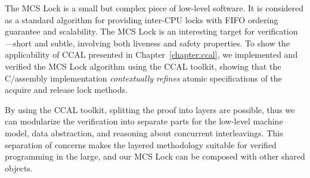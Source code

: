 


The MCS Lock is a small but complex piece of low-level software.
It is considered as a standard algorithm for providing inter-CPU locks with FIFO ordering guarantee and scalability.
The MCS Lock is an interesting target for verification---short and subtle, involving both liveness and safety properties. 
To show the applicability of CCAL presented in Chapter~\ref{chapter:ccal},
we implemented and verified the MCS Lock algorithm using the CCAL toolkit, 
showing that the C/assembly implementation {\em contextually refines} atomic specifications of the acquire and release lock methods.

By using the CCAL toolkit, splitting the proof into layers are possible,
thus we can modularize the verification into separate parts for the low-level machine model, data abstraction, and reasoning about concurrent interleavings.
  This separation of concerns makes the layered methodology suitable for verified programming in the large, and our 
  MCS Lock can be composed with other shared objects.

